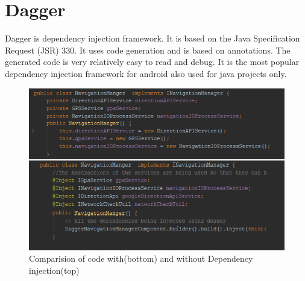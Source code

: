     \section{Dagger}
        \label{appendix:dagger}
        Dagger is dependency injection framework. It is based on the 
        Java Specification Request (JSR) 330. 
        It uses code generation and is based 
        on annotations. The generated code is very relatively easy to read 
        and debug. It is the most popular dependency injection framework
        for android also used for java projects only.


    \begin{figure}[htbp!]
        \centering \includegraphics{grafiken/di_compare.png}
        \caption{Comparision of code with(bottom) and without Dependency injection(top)}
        \label{fig:DIComparision}
    \end{figure}

    